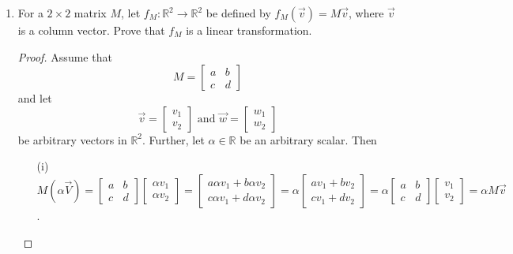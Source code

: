 \documentclass[letter]{article}
\newcommand{\R}{\mathbb{R}}
\newcommand{\mat}[1]{\begin{bmatrix}#1\end{bmatrix}}
\newenvironment{answer}{
	\begin{adjustwidth}{8mm}{} \vspace{2mm}}{\end{adjustwidth} \vspace{2mm}
}
\theoremstyle{plain}
\theoremstyle{definition}
\theoremstyle{remark}
\begin{document}
\begin{enumerate}
\begin{enumerate}
				\begin{answer}
					\begin{proof}
					For any vectors $\vec{u}, \vec{w} \in \R^n$, and scalar $\alpha \in \R$, we have that 
					\begin{enumerate}
						\item[(i)] $d_{\vec{v}}(\alpha\vec{u}) = \vec{v} \cdot (\alpha\vec{w}) = \alpha(\vec{v} \cdot \vec{w}) = \alpha d_{\vec{v}}(\vec{u})$
						\item[(ii)] $d_{\vec{v}}(\vec{u} + \vec{w}) = \vec{v}\cdot(\vec{u} + \vec{w}) = \vec{v}\cdot\vec{u} + \vec{v}\cdot\vec{w} = d_{\vec{v}}(\vec{u}) + d_{\vec{v}}(\vec{w})$. 
					\end{enumerate}
					Therefore, $d_{\vec{v}}$ is linear. 
					\end{proof}
				\end{answer}
				\item For a $2\times 2$ matrix $M$, let $f_{M}:\R^2\to\R^2$ be defined by
					$f_M(\vec v) = M\vec v$, where $\vec v$ is a column vector.  Prove that
					$f_M$ is a linear transformation.
				\begin{answer}
					\begin{proof}
					Assume that
					\[
					M = \left[\begin{array}{cc}								a & b\\
					c & d
					\end{array}\right]
					\]
					and let
					\[
					\vec{v} = \mat{v_1 \\ v_2} \text{ and } \vec{w} = \mat{w_1 \\ w_2}
					\]
					be arbitrary vectors in $\R^2$. Further, let $\alpha \in \R$ be an arbitrary scalar. Then
					\begin{enumerate}
						\item[(i)] $\displaystyle M(\alpha \vec{V}) = \left[\begin{array}{cc}									a & b\\
					c & d
					\end{array}\right]
					\mat{\alpha v_1 \\ \alpha v_2} = \mat{a\alpha v_1 + b\alpha v_2 \\ c\alpha v_1 + d\alpha v_2} = \alpha\mat{a v_1 + bv_2 \\ cv_1 + dv_2} = \alpha\left[\begin{array}{cc}												a & b\\
					c & d
					\end{array}\right]
					\mat{v_1 \\v_2} = \alpha M\vec{v}$. 

\end{enumerate}
\end{proof}
\end{answer}
\end{enumerate}
\end{enumerate}
\end{document}
